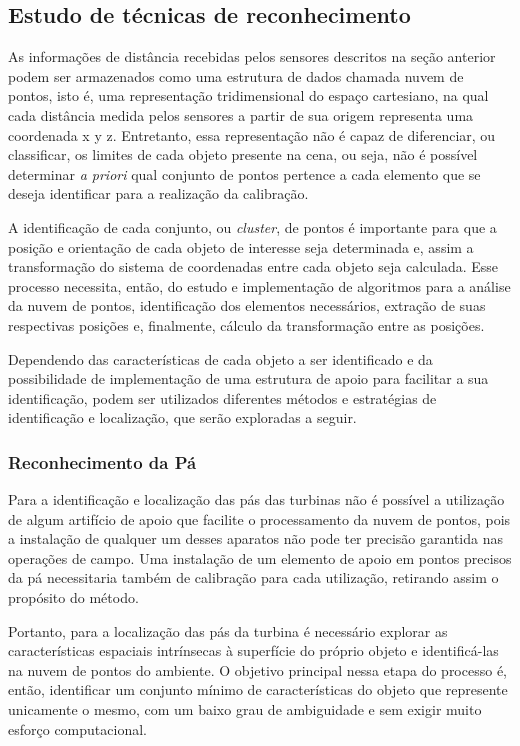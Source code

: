 \subsection{Estudo de técnicas de reconhecimento} 

As informações de distância recebidas pelos sensores descritos na seção
anterior podem ser armazenados como uma estrutura de dados chamada nuvem de
pontos, isto é, uma representação tridimensional do espaço cartesiano, na qual cada distância medida pelos
sensores a partir de sua origem representa uma coordenada x y z.
Entretanto, essa representação não é capaz de diferenciar, ou classificar, os
limites de cada objeto presente na cena, ou seja, não é possível determinar
\textit{a priori} qual conjunto de pontos pertence a cada elemento que se deseja
identificar para a realização da calibração.

A identificação de cada conjunto, ou \textit{cluster}, de pontos é importante
para que a posição e orientação de cada objeto de interesse seja determinada e,
assim a transformação do sistema de coordenadas entre cada objeto seja
calculada. Esse processo necessita, então, do estudo e implementação de
algoritmos para a análise da nuvem de pontos, identificação dos elementos
necessários, extração de suas respectivas posições e, finalmente, cálculo da
transformação entre as posições. 

Dependendo das características de cada objeto a ser identificado e da
possibilidade de implementação de uma estrutura de apoio para facilitar a sua
identificação, podem ser utilizados diferentes métodos e estratégias de
identificação e localização, que serão exploradas a seguir.

\subsubsection{Reconhecimento da Pá} 

Para a identificação e localização das pás das turbinas não é possível a
utilização de algum artifício de apoio que facilite o processamento da nuvem de
pontos, pois a instalação de qualquer um desses aparatos não pode ter precisão
garantida nas operações de campo. Uma instalação de um elemento de apoio em
pontos precisos da pá necessitaria também de calibração para cada utilização, retirando assim
o propósito do método. 

Portanto, para a localização das pás da turbina é
necessário explorar as características espaciais intrínsecas à superfície do
próprio objeto e identificá-las na nuvem de pontos do ambiente. O objetivo
principal nessa etapa do processo é, então, identificar um conjunto mínimo de
características do objeto que represente unicamente o mesmo, com um baixo grau
de ambiguidade e sem exigir muito esforço computacional. 

